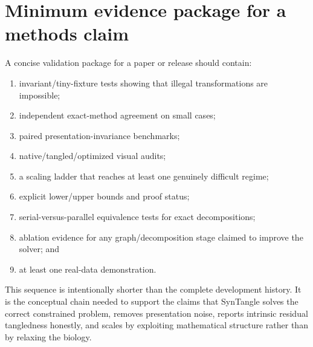 \documentclass[11pt]{article}
\begin{document}
\section{Minimum evidence package for a methods claim}

A concise validation package for a paper or release should contain:

\begin{enumerate}
  \item invariant/tiny-fixture tests showing that illegal transformations are
        impossible;
  \item independent exact-method agreement on small cases;
  \item paired presentation-invariance benchmarks;
  \item native/tangled/optimized visual audits;
  \item a scaling ladder that reaches at least one genuinely difficult regime;
  \item explicit lower/upper bounds and proof status;
  \item serial-versus-parallel equivalence tests for exact decompositions;
  \item ablation evidence for any graph/decomposition stage claimed to improve
        the solver; and
  \item at least one real-data demonstration.
\end{enumerate}

This sequence is intentionally shorter than the complete development history.
It is the conceptual chain needed to support the claims that SynTangle solves
the correct constrained problem, removes presentation noise, reports intrinsic
residual tangledness honestly, and scales by exploiting mathematical structure
rather than by relaxing the biology.
\end{document}
